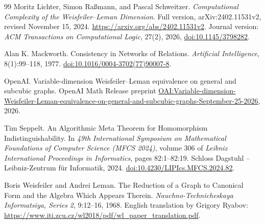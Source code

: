 \begin{thebibliography}{99}
Moritz Lichter, Simon Ra\ss mann, and Pascal Schweitzer.
\newblock \emph{Computational Complexity of the Weisfeiler--Leman Dimension}.
\newblock Full version, arXiv:2402.11531v2, revised November 15, 2024.
\newblock \url{https://arxiv.org/abs/2402.11531v2}.
\newblock Journal version: \emph{ACM Transactions on Computational Logic},
27(2), 2026,
\href{https://doi.org/10.1145/3798282}{doi:10.1145/3798282}.

Alan K. Mackworth.
\newblock Consistency in Networks of Relations.
\newblock \emph{Artificial Intelligence}, 8(1):99--118, 1977.
\newblock
\href{https://doi.org/10.1016/0004-3702(77)90007-8}{doi:10.1016/0004-3702(77)90007-8}.

OpenAI.
\newblock Variable-dimension Weisfeiler--Leman equivalence on general and subcubic graphs.
\newblock OpenAI Math Release preprint
\href{https://github.com/openai/math/blob/main/preprints/Variable-dimension-Weisfeiler-Leman-equivalence-on-general-and-subcubic-graphs-September-25-2026/paper.pdf}{OAI:Variable-dimension-Weisfeiler-Leman-equivalence-on-general-and-subcubic-graphs-September-25-2026}, 2026.

Tim Seppelt.
\newblock An Algorithmic Meta Theorem for Homomorphism Indistinguishability.
\newblock In \emph{49th International Symposium on Mathematical Foundations
of Computer Science (MFCS 2024)}, volume 306 of \emph{Leibniz International
Proceedings in Informatics}, pages 82:1--82:19.
Schloss Dagstuhl -- Leibniz-Zentrum f\"ur Informatik, 2024.
\newblock
\href{https://doi.org/10.4230/LIPIcs.MFCS.2024.82}{doi:10.4230/LIPIcs.MFCS.2024.82}.

Boris Weisfeiler and Andrei Leman.
\newblock The Reduction of a Graph to Canonical Form and the Algebra
Which Appears Therein.
\newblock \emph{Nauchno-Technicheskaya Informatsiya, Series 2},
9:12--16, 1968.
\newblock English translation by Grigory Ryabov:
\url{https://www.iti.zcu.cz/wl2018/pdf/wl_paper_translation.pdf}.

\end{thebibliography}
